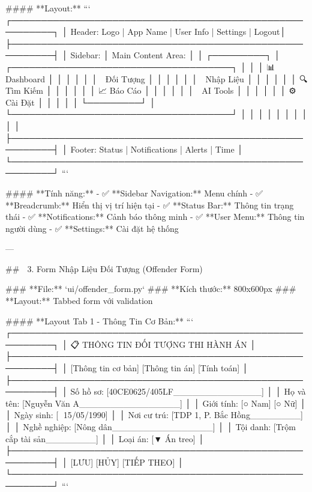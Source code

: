 #### **Layout:**
```
┌─────────────────────────────────────────────────────────┐
│ Header: Logo | App Name | User Info | Settings | Logout│
├─────────────────────────────────────────────────────────┤
│ Sidebar:     │ Main Content Area:                      │
│ ┌─────────┐  │ ┌─────────────────────────────────────┐ │
│ │ 📊 Dashboard    │ │                                 │ │
│ │ 👥 Đối Tượng   │ │                                 │ │
│ │ 📝 Nhập Liệu   │ │                                 │ │
│ │ 🔍 Tìm Kiếm   │ │                                 │ │
│ │ 📈 Báo Cáo     │ │                                 │ │
│ │ 🤖 AI Tools    │ │                                 │ │
│ │ ⚙️ Cài Đặt     │ │                                 │ │
│ └─────────┘  │ └─────────────────────────────────────┘ │
│              │                                         │
│              │                                         │
│              │                                         │
├─────────────────────────────────────────────────────────┤
│ Footer: Status | Notifications | Alerts | Time        │
└─────────────────────────────────────────────────────────┘
```

#### **Tính năng:**
- ✅ **Sidebar Navigation:** Menu chính
- ✅ **Breadcrumb:** Hiển thị vị trí hiện tại
- ✅ **Status Bar:** Thông tin trạng thái
- ✅ **Notifications:** Cảnh báo thông minh
- ✅ **User Menu:** Thông tin người dùng
- ✅ **Settings:** Cài đặt hệ thống

---

## 📝 3. Form Nhập Liệu Đối Tượng (Offender Form)

### **File:** `ui/offender_form.py`
### **Kích thước:** 800x600px
### **Layout:** Tabbed form với validation

#### **Layout Tab 1 - Thông Tin Cơ Bản:**
```
┌─────────────────────────────────────────────────────────┐
│ 📋 THÔNG TIN ĐỐI TƯỢNG THI HÀNH ÁN                    │
├─────────────────────────────────────────────────────────┤
│ [Thông tin cơ bản] [Thông tin án] [Tính toán]        │
├─────────────────────────────────────────────────────────┤
│ Số hồ sơ:        [40CE0625/405LF______________]       │
│ Họ và tên:       [Nguyễn Văn A________________]       │
│ Giới tính:       [○ Nam] [○ Nữ]                       │
│ Ngày sinh:       [📅 15/05/1990]                      │
│ Nơi cư trú:      [TDP 1, P. Bắc Hồng________]        │
│ Nghề nghiệp:     [Nông dân________________]           │
│ Tội danh:        [Trộm cắp tài sản________]           │
│ Loại án:         [▼ Án treo]                          │
├─────────────────────────────────────────────────────────┤
│                    [LƯU] [HỦY] [TIẾP THEO]            │
└─────────────────────────────────────────────────────────┘
```

